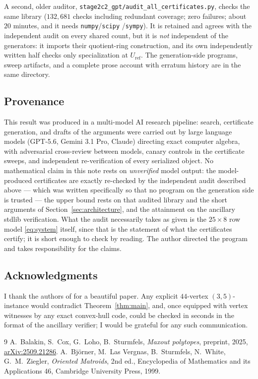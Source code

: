 \documentclass[11pt]{amsart}
\theoremstyle{remark}
\begin{document}
A second, older auditor,
\texttt{stage2c2\_gpt/audit\_all\_certificates.py}, checks the same
library ($132{,}681$ checks including redundant coverage; zero
failures; about $20$ minutes, and it needs \texttt{numpy}/\texttt{scipy}
/\texttt{sympy}). It is retained and agrees with the independent audit
on every shared count, but it is \emph{not} independent of the
generators: it imports their quotient-ring construction, and its own
independently written half checks only specialization at
$U_{\mathrm{ref}}$. The generation-side programs, sweep artifacts, and
a complete prose account with erratum history are in the same
directory.

\subsection*{Provenance}
This result was produced in a multi-model AI research pipeline: search,
certificate generation, and drafts of the arguments were carried out by
large language models (GPT-5.6, Gemini 3.1 Pro, Claude) directing exact
computer algebra, with adversarial cross-review between models, canary
controls in the certificate sweeps, and independent re-verification of
every serialized object. No mathematical claim in this note rests on
\emph{unverified} model output: the model-produced certificates are
exactly re-checked by the independent audit described above --- which
was written specifically so that no program on the generation side is
trusted --- the upper bound rests on that audited library and the short
arguments of Section~\ref{sec:architecture}, and the attainment on the
ancillary stdlib verification. What the audit necessarily takes as
given is the $25\times8$ row model \eqref{eq:system} itself, since that
is the statement of what the certificates certify; it is short enough
to check by reading. The author directed the program and takes
responsibility for the claims.

\subsection*{Acknowledgments}
I thank the authors of \cite{BCLS} for a beautiful paper. Any explicit
$44$-vertex $(3,5)$-instance would contradict Theorem~\ref{thm:main},
and, once equipped with vertex witnesses by any exact convex-hull
code, could be checked in seconds in the format of the ancillary
verifier; I would be grateful for any such communication.

\begin{thebibliography}{9}
A.~Balakin, S.~Cox, G.~Loho, B.~Sturmfels,
\emph{Maxout polytopes},
preprint, 2025, \href{https://arxiv.org/abs/2509.21286}{arXiv:2509.21286}.
A.~Bj\"orner, M.~Las Vergnas, B.~Sturmfels, N.~White, G.~M.~Ziegler,
\emph{Oriented Matroids}, 2nd ed., Encyclopedia of Mathematics and its
Applications 46, Cambridge University Press, 1999.
\end{thebibliography}
\end{document}
